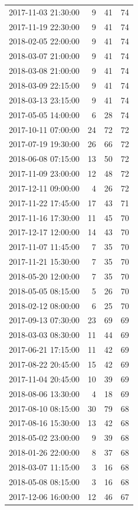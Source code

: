 \begin{tabular}{lrrr}
2017-11-03 21:30:00 & 9 & 41 & 74 \\
2017-11-19 22:30:00 & 9 & 41 & 74 \\
2018-02-05 22:00:00 & 9 & 41 & 74 \\
2018-03-07 21:00:00 & 9 & 41 & 74 \\
2018-03-08 21:00:00 & 9 & 41 & 74 \\
2018-03-09 22:15:00 & 9 & 41 & 74 \\
2018-03-13 23:15:00 & 9 & 41 & 74 \\
2017-05-05 14:00:00 & 6 & 28 & 74 \\
2017-10-11 07:00:00 & 24 & 72 & 72 \\
2017-07-19 19:30:00 & 26 & 66 & 72 \\
2018-06-08 07:15:00 & 13 & 50 & 72 \\
2017-11-09 23:00:00 & 12 & 48 & 72 \\
2017-12-11 09:00:00 & 4 & 26 & 72 \\
2017-11-22 17:45:00 & 17 & 43 & 71 \\
2017-11-16 17:30:00 & 11 & 45 & 70 \\
2017-12-17 12:00:00 & 14 & 43 & 70 \\
2017-11-07 11:45:00 & 7 & 35 & 70 \\
2017-11-21 15:30:00 & 7 & 35 & 70 \\
2018-05-20 12:00:00 & 7 & 35 & 70 \\
2018-05-05 08:15:00 & 5 & 26 & 70 \\
2018-02-12 08:00:00 & 6 & 25 & 70 \\
2017-09-13 07:30:00 & 23 & 69 & 69 \\
2018-03-03 08:30:00 & 11 & 44 & 69 \\
2017-06-21 17:15:00 & 11 & 42 & 69 \\
2017-08-22 20:45:00 & 15 & 42 & 69 \\
2017-11-04 20:45:00 & 10 & 39 & 69 \\
2018-08-06 13:30:00 & 4 & 18 & 69 \\
2017-08-10 08:15:00 & 30 & 79 & 68 \\
2017-08-16 15:30:00 & 13 & 42 & 68 \\
2018-05-02 23:00:00 & 9 & 39 & 68 \\
2018-01-26 22:00:00 & 8 & 37 & 68 \\
2018-03-07 11:15:00 & 3 & 16 & 68 \\
2018-05-08 08:15:00 & 3 & 16 & 68 \\
2017-12-06 16:00:00 & 12 & 46 & 67 \\

\end{tabular}
